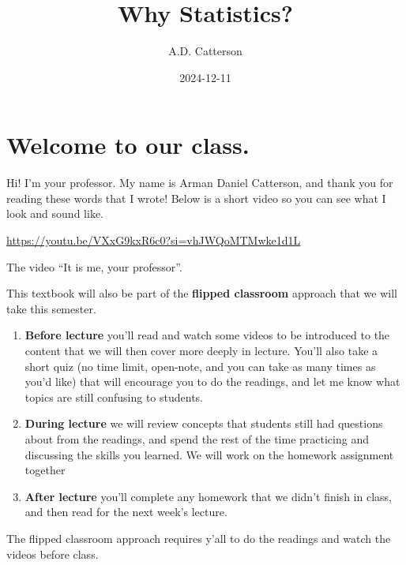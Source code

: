 \documentclass[
  letterpaper,
  DIV=11,
  numbers=noendperiod]{scrreprt}
\title{Why Statistics?}
\author{A.D. Catterson}
\date{2024-12-11}
\providecommand{\tightlist}{%
  \setlength{\itemsep}{0pt}\setlength{\parskip}{0pt}}\usepackage{longtable,booktabs,array}
\renewcommand*\contentsname{Table of contents}
\newcommand\contentsname{Table of contents}
\begin{document}
\maketitle

\renewcommand*\contentsname{Table of contents}
{
\hypersetup{linkcolor=}
\setcounter{tocdepth}{2}
\tableofcontents
}


\chapter*{Welcome to our class.}\label{welcome-to-our-class.}


Hi! I'm your professor. My name is Arman Daniel Catterson, and thank you
for reading these words that I wrote! Below is a short video so you can
see what I look and sound like.

\label{vid-prof}
\url{https://youtu.be/VXxG9kxR6c0?si=vhJWQoMTMwke1d1L}

The video ``It is me, your professor''.

This textbook will also be part of the \textbf{flipped classroom}
approach that we will take this semester.

\begin{enumerate}
\def\labelenumi{\arabic{enumi}.}
\tightlist
\item
  \textbf{Before lecture} you'll read and watch some videos to be
  introduced to the content that we will then cover more deeply in
  lecture. You'll also take a short quiz (no time limit, open-note, and
  you can take as many times as you'd like) that will encourage you to
  do the readings, and let me know what topics are still confusing to
  students.
\item
  \textbf{During lecture} we will review concepts that students still
  had questions about from the readings, and spend the rest of the time
  practicing and discussing the skills you learned. We will work on the
  homework assignment together
\item
  \textbf{After lecture} you'll complete any homework that we didn't
  finish in class, and then read for the next week's lecture.
\end{enumerate}

The flipped classroom approach requires y'all to do the readings and
watch the videos before class.
\end{document}
